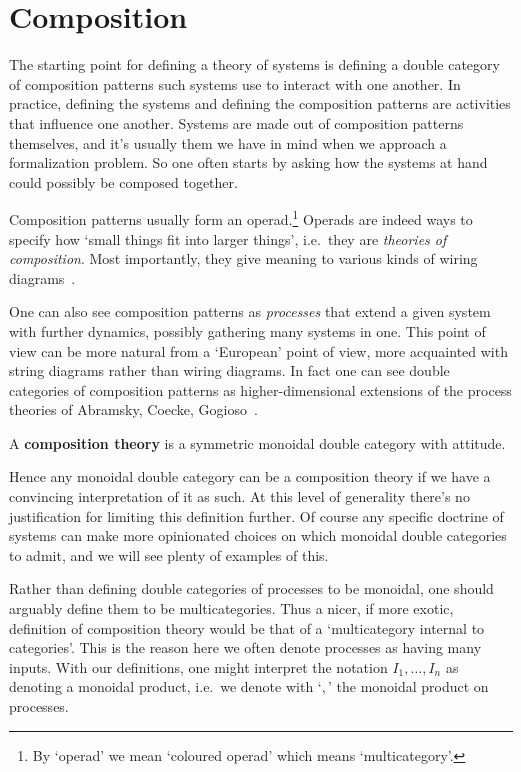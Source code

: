 \section{Composition}
The starting point for defining a theory of systems is defining a double category of composition patterns such systems use to interact with one another.
In practice, defining the systems and defining the composition patterns are activities that influence one another.
Systems are made out of composition patterns themselves, and it's usually them we have in mind when we approach a formalization problem.
So one often starts by asking how the systems at hand could possibly be composed together.

Composition patterns usually form an operad.\footnote{By `operad' we mean `coloured operad' which means `multicategory'.}
Operads are indeed ways to specify how `small things fit into larger things', i.e.~they are \emph{theories of composition}.
Most importantly, they give meaning to various kinds of wiring diagrams~\cite{spivak2013operad,vagner2014algebras, libkind2021operadic}.

One can also see composition patterns as \emph{processes} that extend a given system with further dynamics, possibly gathering many systems in one.
This point of view can be more natural from a `European' point of view, more acquainted with string diagrams rather than wiring diagrams.
In fact one can see double categories of composition patterns as higher-dimensional extensions of the process theories of Abramsky, Coecke, Gogioso~\cite{abramsky2004categorical, coecke2018picturing}.

\begin{definition}
	A \textbf{composition theory} is a symmetric monoidal double category with attitude.
\end{definition}

Hence any monoidal double category can be a composition theory if we have a convincing interpretation of it as such.
At this level of generality there's no justification for limiting this definition further.
Of course any specific doctrine of systems can make more opinionated choices on which monoidal double categories to admit, and we will see plenty of examples of this.

\begin{remark}
	Rather than defining double categories of processes to be monoidal, one should arguably define them to be multicategories.
	Thus a nicer, if more exotic, definition of composition theory would be that of a `multicategory internal to categories'.
	This is the reason here we often denote processes as having many inputs.
	With our definitions, one might interpret the notation $I_1, \ldots, I_n$ as denoting a monoidal product, i.e.~we denote with `$, $' the monoidal product on processes.
\end{remark}

